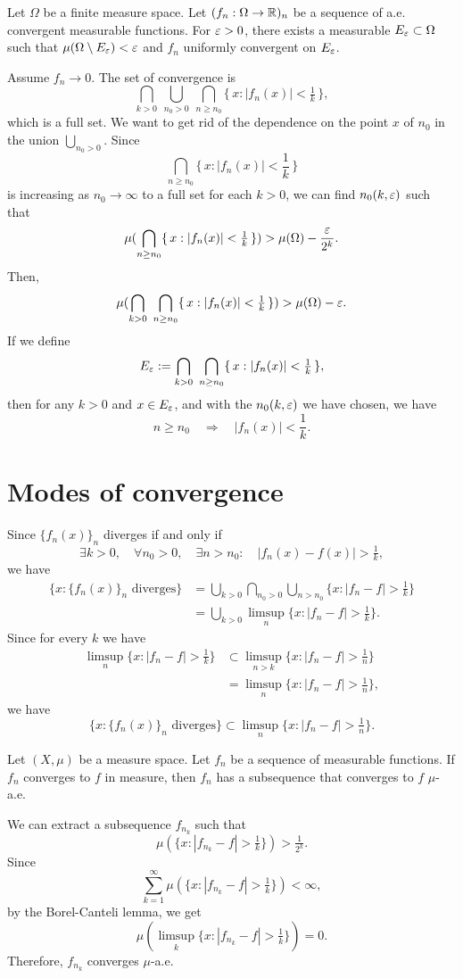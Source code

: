 \documentclass{../note}
\begin{document}
\begin{prb}
Let $\Omega$ be a finite measure space.
Let $(f_n:\Omega\to\mathbb{R})_n$ be a sequence of a.e. convergent measurable functions.
For $\varepsilon>0$, there exists a measurable $E_\varepsilon\subset\Omega$ such that $\mu(\Omega\setminus E_\varepsilon)<\varepsilon$ and $f_n$ uniformly convergent on $E_\varepsilon$.
\end{prb}
\begin{pf}
Assume $f_n\to0$.
The set of convergence is
\[\bigcap_{k>0}\ \bigcup_{n_0>0}\ \bigcap_{n\ge n_0}\{\,x:|f_n(x)|<\tfrac1k\,\},\]
which is a full set.
We want to get rid of the dependence on the point $x$ of $n_0$ in the union $\bigcup_{n_0>0}$.
Since
\[\bigcap_{n\ge n_0}\{\,x:|f_n(x)|<\frac1k\,\}\]
is increasing as $n_0\to\infty$ to a full set for each $k>0$, we can find $n_0(k,\varepsilon)$ such that
\[\mu(\bigcap_{n\ge n_0}\{\,x:|f_n(x)|<\tfrac1k\,\})>\mu(\Omega)-\frac{\varepsilon}{2^k}.\]
Then,
\[\mu(\bigcap_{k>0}\ \bigcap_{n\ge n_0}\{\,x:|f_n(x)|<\tfrac1k\,\})>\mu(\Omega)-\varepsilon.\]
If we define
\[E_\e:=\bigcap_{k>0}\ \bigcap_{n\ge n_0}\{\,x:|f_n(x)|<\tfrac1k\,\},\]
then for any $k>0$ and $x\in E_\varepsilon$, and with the $n_0(k,\varepsilon)$ we have chosen,
we have
\[n\ge n_0\quad\Rightarrow\quad |f_n(x)|<\frac1k.\]
\end{pf}

\section{Modes of convergence}

Since $\{f_n(x)\}_n$ diverges if and only if
\[\exists k>0,\quad\forall n_0>0,\quad\exists n>n_0:\quad|f_n(x)-f(x)|>\tfrac1k,\]
we have
\begin{align*}
\{x:\{f_n(x)\}_n\text{ diverges}\}
&=\bigcup_{k>0}\bigcap_{n_0>0}\bigcup_{n>n_0}\{x:|f_n-f|>\tfrac1k\}\\
&=\bigcup_{k>0}\limsup_n\{x:|f_n-f|>\tfrac1k\}.
\end{align*}
Since for every $k$ we have
\begin{align*}
\limsup_n\{x:|f_n-f|>\tfrac1k\}
&\subset\limsup_{n>k}\{x:|f_n-f|>\tfrac1n\}\\
&=\limsup_n\{x:|f_n-f|>\tfrac1n\},
\end{align*}
we have
\[\{x:\{f_n(x)\}_n\text{ diverges}\}\subset\limsup_n\{x:|f_n-f|>\tfrac1n\}.\]




\begin{prb}
Let $(X,\mu)$ be a measure space.
Let $f_n$ be a sequence of measurable functions.
If $f_n$ converges to $f$ in measure, then $f_n$ has a subsequence that converges to $f$ $\mu$-a.e.
\end{prb}
\begin{pf}
We can extract a subsequence $f_{n_k}$ such that
\[\mu(\{x:|f_{n_k}-f|>\tfrac1k\})>\tfrac1{2^k}.\]
Since
\[\sum_{k=1}^\infty\mu(\{x:|f_{n_k}-f|>\tfrac1k\})<\infty,\]
by the Borel-Canteli lemma, we get
\[\mu(\limsup_k\{x:|f_{n_k}-f|>\tfrac1k\})=0.\]
Therefore, $f_{n_k}$ converges $\mu$-a.e.
\end{pf}
\end{document}
